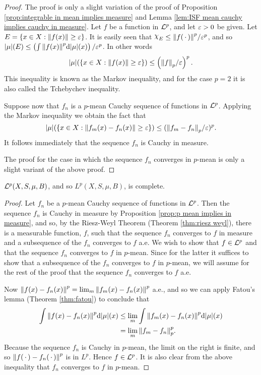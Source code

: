 \begin{proof}
The proof is only a slight variation of the proof of Proposition \ref{prop:integrable in mean implies measure} and Lemma \ref{lem:ISF mean cauchy implies cauchy in measure}. Let $f$ be a function in ${\cal L}^p$, and let $\varepsilon>0$ be given. Let $E=\left\{x\in X:\norm{f(x)}\geq\varepsilon\right\}$. It is easily seen that $\idf{E}\leq\norm{f(\imarg)}^p/\ep^p$, and so $|\mu|(E)\leq\left(\int\norm{f(x)}^p\dd|\mu|(x)\right)/\varepsilon^p$. In other words $$|\mu|(\left\{x\in X:\norm{f(x)}\geq\varepsilon\right\})\leq\left(\norm{f}_p/\varepsilon\right)^p.$$
This inequality is known as the Markov inequality, and for the case $p=2$ it is also called the Tchebychev inequality.

Suppose now that $f_n$ is a $p$-mean Cauchy sequence of functions in ${\cal L}^p$. Applying the Markov inequality we obtain the fact that $$|\mu|(\left\{x\in X:\norm{f_m(x)-f_n(x)}\geq\varepsilon\right\})\leq(\norm{f_m-f_n}_p/\varepsilon)^p.$$
It follows immediately that the sequence $f_n$ is Cauchy in measure.

The proof for the case in which the sequence $f_n$ converges in $p$-mean is only a slight variant of the above proof.
\end{proof}

\begin{theorem}
${\cal L}^p(X,S,\mu,B)$, and so $L^p(X,S,\mu,B)$, is complete.
\end{theorem}

\begin{proof}
Let $f_n$ be a $p$-mean Cauchy sequence of functions in ${\cal L}^p$. Then the sequence $f_n$ is Cauchy in measure by Proposition \ref{prop:p mean implies in measure}, and so, by the Riesz-Weyl Theorem (Theorem \ref{thm:riesz weyl}), there is a measurable function, $f$, such that the sequence $f_n$ converges to $f$ in measure and a subsequence of the $f_n$ converges to $f$ a.e. We wish to show that $f\in{\cal L}^p$ and that the sequence $f_n$ converges to $f$ in $p$-mean. Since for the latter it suffices to show that a subsequence of the $f_n$ converges to $f$ in $p$-mean, we will assume for the rest of the proof that the sequence $f_n$ converges to $f$ a.e.

Now $\norm{f(x)-f_n(x)}^p=\lim_m\norm{f_m(x)-f_n(x)}^p$ a.e., and so we can apply Fatou's lemma (Theorem \ref{thm:fatou}) to conclude that
\begin{align*}
    \int\norm{f(x)-f_n(x)}^p\dd|\mu|(x)&\leq\lim _m\int\norm{f_m(x)-f_n(x)}^p\dd|\mu|(x)\\
    &=\lim_m\norm{f_m-f_n}_p^p.
\end{align*} Because the sequence $f_n$ is Cauchy in $p$-mean, the limit on the right is finite, and so $\norm{f(\,\cdot\,)-f_n(\,\cdot\,)}^p$ is in $L^p$. Hence $f\in{\cal L}^p$. It is also clear from the above inequality that $f_n$ converges to $f$ in $p$-mean.
\end{proof}

